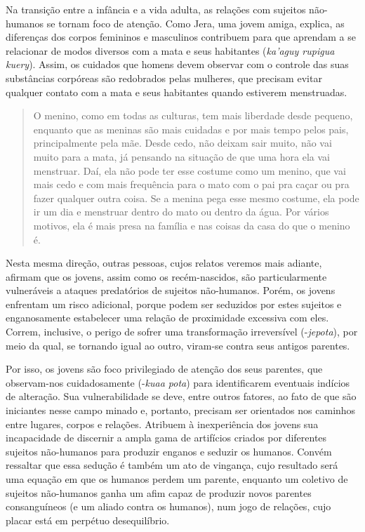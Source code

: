 Na transição entre a infância e a vida adulta, as relações com sujeitos
não-humanos se tornam foco de atenção. Como Jera, uma jovem amiga,
explica, as diferenças dos corpos femininos e masculinos contribuem para
que aprendam a se relacionar de modos diversos com a mata e seus
habitantes (\emph{ka'aguy rupigua kuery}). Assim, os cuidados que homens
devem observar com o controle das suas substâncias corpóreas são
redobrados pelas mulheres, que precisam evitar qualquer contato com a
mata e seus habitantes quando estiverem menstruadas.

\begin{quote}
O menino, como em todas as culturas, tem mais liberdade desde pequeno,
enquanto que as meninas são mais cuidadas e por mais tempo pelos pais,
principalmente pela mãe. Desde cedo, não deixam sair muito, não vai
muito para a mata, já pensando na situação de que uma hora ela vai
menstruar. Daí, ela não pode ter esse costume como um menino, que vai
mais cedo e com mais frequência para o mato com o pai pra caçar ou pra
fazer qualquer outra coisa. Se a menina pega esse mesmo costume, ela
pode ir um dia e menstruar dentro do mato ou dentro da água. Por vários
motivos, ela é mais presa na família e nas coisas da casa do que o
menino é.
\end{quote}

Nesta mesma direção, outras pessoas, cujos relatos veremos mais adiante,
afirmam que os jovens, assim como os recém-nascidos, são particularmente
vulneráveis a ataques predatórios de sujeitos não-humanos. Porém, os
jovens enfrentam um risco adicional, porque podem ser seduzidos por
estes sujeitos e enganosamente estabelecer uma relação de proximidade
excessiva com eles. Correm, inclusive, o perigo de sofrer uma
transformação irreversível (-\emph{jepota}), por meio da qual, se
tornando igual ao outro, viram-se contra seus antigos parentes.

Por isso, os jovens são foco privilegiado de atenção dos seus parentes,
que observam-nos cuidadosamente (-\emph{kuaa pota}) para identificarem
eventuais indícios de alteração. Sua vulnerabilidade se deve, entre
outros fatores, ao fato de que são iniciantes nesse campo minado e,
portanto, precisam ser orientados nos caminhos entre lugares, corpos e
relações. Atribuem à inexperiência dos jovens sua incapacidade de
discernir a ampla gama de artifícios criados por diferentes sujeitos
não-humanos para produzir enganos e seduzir os humanos. Convém ressaltar
que essa sedução é também um ato de vingança, cujo resultado será uma
equação em que os humanos perdem um parente, enquanto um coletivo de
sujeitos não-humanos ganha um afim capaz de produzir novos parentes
consanguíneos (e um aliado contra os humanos), num jogo de relações,
cujo placar está em perpétuo desequilíbrio.

